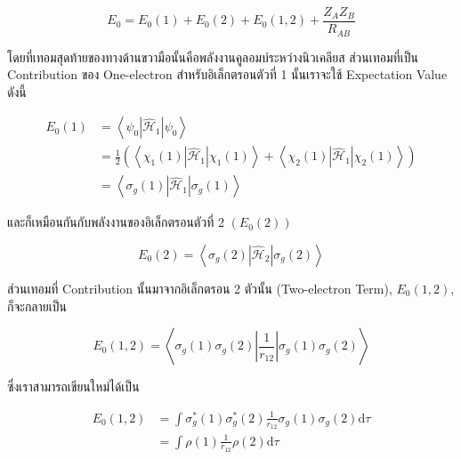 \begin{equation}
    \label{eq:Energy_hydrogen_molecule}
    E_0 = E_0(1) + E_0(2) + E_0(1,2) + \frac{Z_A Z_B}{R_{A B}}
\end{equation}

\noindent โดยที่เทอมสุดท้ายของทางด้านขวามือนั้นคือพลังงานคูลอมบ์ระหว่างนิวเคลียส ส่วนเทอมที่เป็น Contribution ของ One-electron
สำหรับอิเล็กตรอนตัวที่ 1 นั้นเราจะใช้ Expectation Value ดังนี้

\begin{equation}
    \begin{aligned}
        E_0(1)
         & = \left\langle\psi_0\left|\hat{\mathscr{H}}_1\right| \psi_0\right\rangle \\
         & = \frac{1}{2}
        \left(
        \left\langle
        \chi_1(1)\left|\hat{\mathscr{H}}_1\right| \chi_1(1)
        \right\rangle
        + \left\langle
        \chi_2(1)\left|\hat{\mathscr{H}}_1\right| \chi_2(1)
        \right\rangle
        \right)                                                                     \\
         & = \left\langle
        \sigma_g(1)\left|\hat{\mathscr{H}}_1\right| \sigma_g(1)
        \right\rangle
    \end{aligned}
\end{equation}

\noindent และก็เหมือนกันกับพลังงานของอิเล็กตรอนตัวที่ 2 $(E_0(2))$

\begin{equation}
    E_0(2)
    =
    \left\langle
    \sigma_g(2)
    \left| \hat{\mathscr{H}}_2 \right|
    \sigma_g(2)
    \right\rangle
\end{equation}

ส่วนเทอมที่ Contribution นั้นมาจากอิเล็กตรอน 2 ตัวนั้น (Two-electron Term), $E_0(1,2)$, ก็จะกลายเป็น

\begin{equation}
    \label{eq:energy_one_electron_ground_state}
    E_0(1,2)
    =
    \left\langle
    \sigma_g(1) \sigma_g(2)\left|\frac{1}{r_{12}}\right| \sigma_g(1) \sigma_g(2)
    \right\rangle
\end{equation}

\noindent ซึ่งเราสามารถเขียนใหม่ได้เป็น

\begin{equation}
    \label{eq:energy_two_electron_ground_state}
    \begin{aligned}
        E_0(1,2)
         & = \int \sigma_g^*(1) \sigma_g^*(2) \frac{1}{r_{12}} \sigma_g(1) \sigma_g(2) \mathrm{d} \tau \\
         & = \int \rho(1) \frac{1}{r_{12}} \rho(2) \mathrm{d} \tau
    \end{aligned}
\end{equation}

